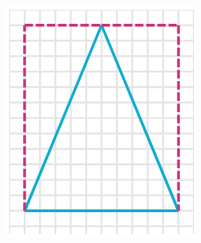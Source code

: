 \begin{solutionbox}{14cm}
    \begin{minipage}{0.4\textwidth}
        \begin{multicols}{2}
            \begin{figure}[H]
                \centering
                \includegraphics[width=0.9\linewidth]{../images/peri_isos_01a.png}
                \caption{}
                \label{fig:peri_isos_01a}
            \end{figure}%
            \begin{figure}[H]
                \centering

\end{figure}
\end{multicols}
\end{minipage}
\end{solutionbox}
